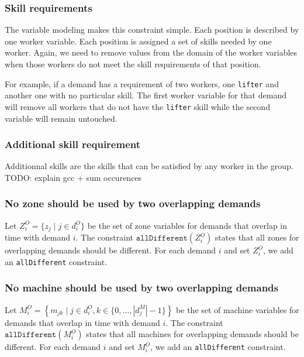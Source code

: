 \documentclass[../thesis.tex]{subfiles}
\begin{document}
\subsubsection{Skill requirements}

The variable modeling makes this constraint simple. Each position is described by one worker variable.
Each position is assigned a set of skills needed by one worker. Again, we need to remove values 
from the domain of the worker variables when those workers do not meet the skill requirements of that position. 

For example, if a demand has a requirement of two workers, one \texttt{lifter} and another one with no particular skill. 
The first worker variable for that demand will remove all workers that do not have the \texttt{lifter} skill while the second variable will remain untouched.

\subsubsection{Additional skill requirement}

Additionnal skills are the skills that can be satisfied by any worker in the group.
TODO: explain gcc + sum occurences

\subsubsection{No zone should be used by two overlapping demands}

Let $Z^O_i = \{ z_j \mid j \in d^O_i \}$ be the set of zone variables for demands that overlap in time with demand $i$.
The constraint $\texttt{allDifferent}(Z^O_i)$ states that all zones for overlapping demands 
should be different. For each demand $i$ and set $Z^O_i$, we add an \texttt{allDifferent} constraint.

\subsubsection{No machine should be used by two overlapping demands}

Let $M^O_i = \left\{ m_{jk} \mid j \in d^O_i, k \in \{0, \dots, |d^M_j| - 1 \} \right\}$ be the set of machine variables for demands that overlap in time 
with demand $i$. The constraint $\texttt{allDifferent}(M^O_i)$ states that all machines for overlapping demands 
should be different. For each demand $i$ and set $M^O_i$, we add an \texttt{allDifferent} constraint.
\end{document}
